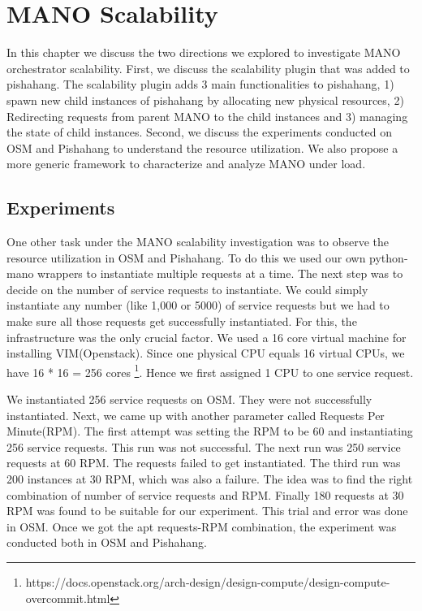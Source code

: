 \chapter{MANO Scalability}
\label{ch:Scalability}

In this chapter we discuss the two directions we explored to investigate MANO orchestrator scalability. First, we discuss the scalability plugin that was added to pishahang. The scalability plugin adds 3 main functionalities to pishahang, 1) spawn new child instances of pishahang by allocating new physical resources, 2) Redirecting requests from parent MANO to the child instances and 3) managing the state of child instances. Second, we discuss the experiments conducted on OSM and Pishahang to understand the resource utilization. We also propose a more generic framework to characterize and analyze MANO under load.





\section{Experiments}
One other task under the MANO scalability investigation was to observe the resource utilization in OSM and Pishahang. To do this we used our own python-mano wrappers to instantiate multiple requests at a time. The next step was to decide on the number of service requests to instantiate. We could simply instantiate any number (like 1,000 or 5000) of service requests but we had to make sure all those requests get successfully instantiated. For this, the infrastructure was the only crucial factor. We used a 16 core virtual machine for installing VIM(Openstack). Since one physical CPU equals 16 virtual CPUs, we have 16 * 16 = 256 cores \footnote{https://docs.openstack.org/arch-design/design-compute/design-compute-overcommit.html}. Hence we first assigned 1 CPU to one service request. 

We instantiated 256 service requests on OSM. They were not successfully instantiated. Next, we came up with another parameter called Requests Per Minute(RPM). The first attempt was setting the RPM to be 60 and instantiating 256 service requests. This run was not successful. The next run was 250 service requests at 60 RPM. The requests failed to get instantiated. The third run was 200 instances at 30 RPM, which was also a failure. The idea was to find the right combination of number of service requests and RPM. Finally 180 requests at 30 RPM was found to be suitable for our experiment. This trial and error was done in OSM. Once we got the apt requests-RPM combination, the experiment was conducted both in OSM and Pishahang.

